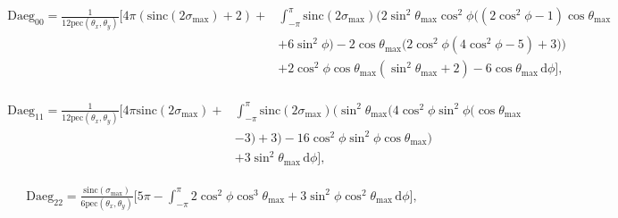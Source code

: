 \documentclass[a4paper,11pt,twoside,openright]{book}
\providecommand{\pec}{{\mathrm{pec}}}%
\providecommand{\sinc}{{\mathrm{sinc}}}%
\def\lthtmlcheckvsize{\ifdim\ht\sizebox<\vsize 
  \ifdim\wd\sizebox<\hsize\expandafter\hfill\fi \expandafter\vfill
  \else\expandafter\vss\fi}%
\begin{document}
{\newpage\clearpage
\setcounter{equation}{52}
%
\begin{subequations}\begin{flalign}
\begin{split}
\textrm{Daeg}_{00} = \frac{1}{12\pec (\theta_x , \theta_y )} \Bigg[
4\pi \left( \sinc (2\sigma_{\textrm{max}}) + 2 \right) + &
\int_{-\pi}^{\pi}
\sinc (2\sigma_{\textrm{max}}) \bigg( 2\sin^2\theta_{\textrm{max}}\cos^2\phi \Big( \left( 2\cos^2\phi - 1 \right) \cos\theta_{\textrm{max}}\\
& + 6\sin^2\phi \Big) - 2\cos\theta_{\textrm{max}}\Big( 2\cos^2\phi \left( 4\cos^2\phi - 5 \right) + 3 \Big) \bigg) \\
& + 2\cos^2\phi \cos\theta_{\textrm{max}}\left( \sin^2\theta_{\textrm{max}}+ 2 \right) - 6\cos\theta_{\textrm{max}}
\,\mathrm{d}\phi
\Bigg] ,
\end{split} &
\end{flalign}\end{subequations}%
\lthtmldisplayZ
\lthtmlcheckvsize\clearpage}

{\newpage\clearpage
\setcounter{equation}{52}
%
\begin{subequations}\begin{flalign}
\begin{split}
\textrm{Daeg}_{11} = \frac{1}{12\pec (\theta_x , \theta_y )}\Bigg[
4\pi \sinc (2\sigma_{\textrm{max}}) + &
\int_{-\pi}^{\pi}
\sinc (2\sigma_{\textrm{max}}) \bigg( \sin^2\theta_{\textrm{max}}\Big( 4\cos^2\phi \sin^2\phi \big( \cos\theta_{\textrm{max}}\\
& - 3 \big) + 3 \Big) - 16\cos^2\phi \sin^2\phi \cos\theta_{\textrm{max}}\bigg) \\
& + 3\sin^2\theta_{\textrm{max}}
\,\mathrm{d}\phi
\Bigg] ,
\end{split} &
\end{flalign}\end{subequations}%
\lthtmldisplayZ
\lthtmlcheckvsize\clearpage}

{\newpage\clearpage
\setcounter{equation}{52}
%
\begin{subequations}\begin{flalign}
&\textrm{Daeg}_{22} = \frac{\sinc (\sigma_{\textrm{max}})}{6\pec (\theta_x , \theta_y )} \Bigg[
5\pi -
\int_{-\pi}^{\pi}
2\cos^2\phi \cos^3\theta_{\textrm{max}}+ 3\sin^2\phi \cos^2\theta_{\textrm{max}}
\,\mathrm{d}\phi
\Bigg] , &
\end{flalign}\end{subequations}%
\lthtmldisplayZ
\lthtmlcheckvsize\clearpage}
\end{document}
